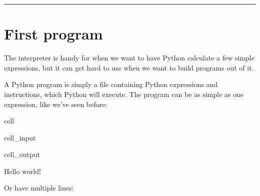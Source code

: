\documentclass[letterpaper,10pt,english]{jupyterBook}
\begin{document}
\bigskip\hrule\bigskip


\sphinxstepscope


\chapter{First program}
\label{\detokenize{first-program:first-program}}\label{\detokenize{first-program::doc}}
\sphinxAtStartPar
The interpreter is handy for when we want to have Python calculate a few simple expressions, but it can get hard to use when we want to build programs out of it.

\sphinxAtStartPar
A Python program is simply a file containing Python expressions and instructions, which Python will execute.
The program can be as simple as one expression, like we’ve seen before:

\begin{sphinxuseclass}{cell}\begin{sphinxVerbatimInput}

\begin{sphinxuseclass}{cell_input}
\begin{sphinxVerbatim}[commandchars=\\\{\}]
\end{sphinxVerbatim}

\end{sphinxuseclass}\end{sphinxVerbatimInput}
\begin{sphinxVerbatimOutput}

\begin{sphinxuseclass}{cell_output}
\begin{sphinxVerbatim}[commandchars=\\\{\}]
Hello world!
\end{sphinxVerbatim}

\end{sphinxuseclass}\end{sphinxVerbatimOutput}

\end{sphinxuseclass}
\sphinxAtStartPar
Or have multiple lines:
\end{document}
